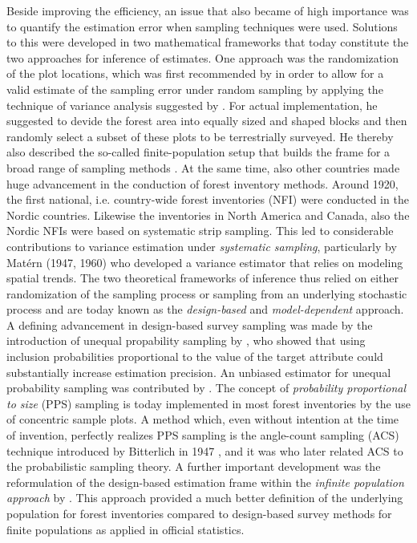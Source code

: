 Beside improving the efficiency, an issue that also became of high importance was to quantify the estimation error when sampling techniques were used. Solutions to this were developed in two mathematical frameworks that today constitute the two approaches for inference of estimates. One approach was the randomization of the plot locations, which was first recommended by \citet{hasel1938} in order to allow for a valid estimate of the sampling error under random sampling by applying the technique of variance analysis suggested by \citet{fisher1925}. For actual implementation, he suggested to devide the forest area into equally sized and shaped blocks and then randomly select a subset of these plots to be terrestrially surveyed. He thereby also described the so-called finite-population setup that builds the frame for a broad range of sampling methods \citep{schreuder1993}. At the same time, also other countries made huge advancement in the conduction of forest inventory methods. Around 1920, the first national, i.e. country-wide forest inventories (NFI) were conducted in the Nordic countries. Likewise the inventories in North America and Canada, also the Nordic NFIs were based on systematic strip sampling. This led to considerable contributions to variance estimation under \textit{systematic sampling}, particularly by Mat\'{e}rn (1947, 1960) who developed a variance estimator that relies on modeling spatial trends. The two theoretical frameworks of inference thus relied on either randomization of the sampling process or sampling from an underlying stochastic process and are today known as the \textit{design-based} and \textit{model-dependent} approach. A defining advancement in design-based survey sampling was made by the introduction of unequal propability sampling by \citet{hansen1943}, who showed that using inclusion probabilities proportional to the value of the target attribute could substantially increase estimation precision. An unbiased estimator for unequal probability sampling was contributed by \citet{horvitz1952}. The concept of \textit{probability proportional to size} (PPS) sampling is today implemented in most forest inventories by the use of concentric sample plots. A method which, even without intention at the time of invention, perfectly realizes PPS sampling is the angle-count sampling (ACS) technique introduced by Bitterlich in 1947 \citep{bitterlich1984}, and it was \citet{grosenbaugh1958} who later related ACS to the probabilistic sampling theory. A further important development was the reformulation of the design-based estimation frame within the \textit{infinite population approach} by \citet{mandallaz2008}. This approach provided a much better definition of the underlying population for forest inventories compared to design-based survey methods for finite populations as applied in official statistics.\par






















